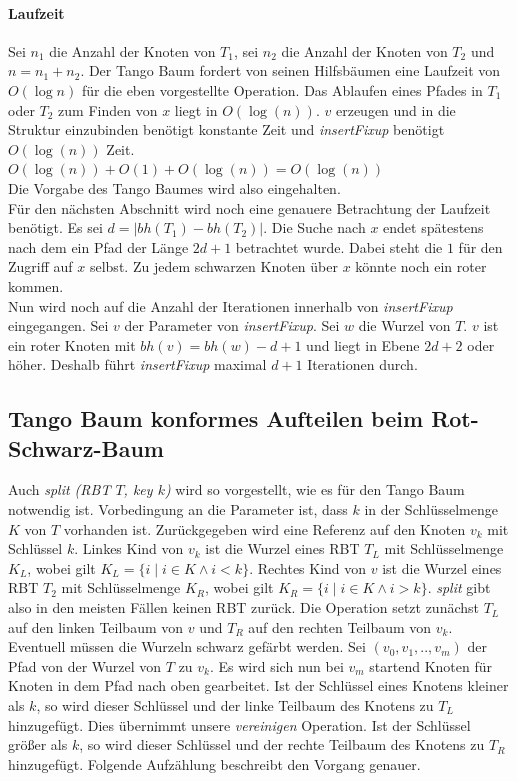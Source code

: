 \documentclass[a4paper,12pt]{article}
\begin{document}
\paragraph{Laufzeit}
Sei $n_1$ die Anzahl der Knoten von $T_1$, sei $n_2$ die Anzahl der Knoten von $T_2$ und $n = n_1 + n_2$. Der Tango Baum fordert von seinen Hilfsbäumen eine Laufzeit von $O(\log n)$ für die eben vorgestellte Operation.  Das Ablaufen eines Pfades in $T_1$ oder $T_2$ zum Finden von $x$ liegt in $O(\log (n))$. $v$ erzeugen und in die Struktur einzubinden benötigt konstante Zeit und \textit{insertFixup} benötigt  $O(\log (n))$ Zeit.\\
$O(\log (n)) + O(1) +O(\log (n)) = O(\log (n
))$\\
Die Vorgabe des Tango Baumes wird also eingehalten.\\
Für den nächsten Abschnitt wird noch eine genauere Betrachtung der Laufzeit benötigt. Es sei $d = \vert \mathit{bh}(T_1) - \mathit{bh}(T_2)  \vert $. Die Suche nach $x$ endet spätestens nach dem ein Pfad der Länge $2d + 1$ betrachtet wurde. Dabei steht die $1$ für den Zugriff auf $x$ selbst. Zu jedem schwarzen Knoten über $x$ könnte noch ein roter kommen.\\
Nun wird noch auf die Anzahl der Iterationen innerhalb von \textit{insertFixup} eingegangen. Sei $v$ der Parameter von \textit{insertFixup}. Sei $w$ die Wurzel von $T$. $v$ ist ein roter Knoten mit $\mathit{bh}(v) = \mathit{bh}(w) - d + 1$ und liegt in Ebene $2d + 2$ oder höher. Deshalb führt \textit{insertFixup} maximal $d + 1$ Iterationen durch.  

\subsection{Tango Baum konformes Aufteilen beim Rot-Schwarz-Baum}
Auch \textit{split (RBT $T$, key $k$)} wird so vorgestellt, wie es für den Tango Baum notwendig ist. Vorbedingung an die Parameter ist, dass $k$ in der Schlüsselmenge $K$ von $T$ vorhanden ist. Zurückgegeben wird eine Referenz auf den Knoten $v_k$ mit Schlüssel $k$. Linkes Kind von $v_k$ ist die Wurzel eines RBT $T_L$ mit Schlüsselmenge $K_L$, wobei gilt ${K_L=\{i \mid  i\in K \land i <k\}}$. Rechtes Kind von $v$ ist die Wurzel eines RBT $T_2$ mit Schlüsselmenge $K_R$, wobei gilt ${K_R = \{i \mid i\in K \land i > k\}}$. \textit{split} gibt also in den meisten Fällen keinen RBT zurück. Die Operation setzt zunächst $T_L$ auf den linken Teilbaum von $v$ und $T_R$ auf den rechten Teilbaum von $v_k$. Eventuell müssen die Wurzeln schwarz gefärbt werden. Sei $(v_0,v_1,..,v_m)$  der Pfad von der Wurzel von $T$ zu $v_k$. Es wird sich nun bei $v_m$ startend Knoten für Knoten in dem Pfad nach oben gearbeitet. Ist der Schlüssel eines Knotens kleiner als $k$, so wird dieser Schlüssel und der linke Teilbaum des Knotens zu $T_L$ hinzugefügt. Dies übernimmt unsere \textit{vereinigen} Operation. Ist der Schlüssel größer als $k$, so wird dieser Schlüssel und der rechte Teilbaum des Knotens zu $T_R$ hinzugefügt. Folgende Aufzählung beschreibt den Vorgang genauer.
\end{document}
